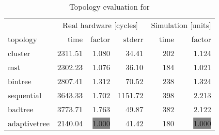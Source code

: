 \begin{table}[htb]
  \centering
  \begin{tabular}{lrrrrr}
  \toprule
  & \multicolumn{3}{c}{Real hardware [cycles]} & \multicolumn{2}{c}{Simulation [units]} \\
  topology & time & factor & stderr & time & factor \\
  \midrule
  cluster & 2311.51 & 1.080 & 34.41 & 202 & 1.124 \\
  mst & 2302.23 & 1.076 & 36.10 & 184 & 1.021 \\
  bintree & 2807.41 & 1.312 & 70.52 & 238 & 1.324 \\
  sequential & 3643.33 & 1.702 & 1151.72 & 398 & 2.213 \\
  badtree & 3773.71 & 1.763 & 49.87 & 382 & 2.122 \\
  adaptivetree & 2140.04 & \colorbox{gray}{1.000} & 41.42 & 180 & \colorbox{gray}{1.000} \\
  \midrule
  \end{tabular}
  \caption{Topology evaluation for \sbrinz}
  \label{tab:sbrinz}
\end{table}
